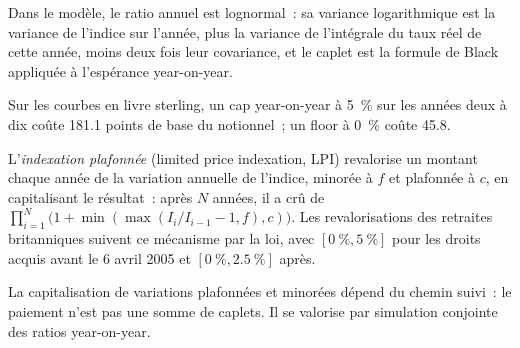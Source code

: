 Dans le modèle, le ratio annuel est lognormal~: sa variance logarithmique est la variance de l'indice
sur l'année, plus la variance de l'intégrale du taux réel de cette année, moins deux fois leur
covariance, et le caplet est la formule de Black appliquée à l'espérance year-on-year.

\begin{example}\label{ex:rc:inflation-derivatives:caps}
Sur les courbes en livre sterling, un cap year-on-year à 5~\% sur les années deux à dix coûte 181.1
points de base du notionnel~; un floor à 0~\% coûte 45.8.
\end{example}

\begin{definition}\label{def:rc:inflation-derivatives:lpi}
L'\emph{indexation plafonnée} (limited price indexation, LPI) revalorise un montant
chaque année de la variation annuelle de l'indice, minorée à $f$ et plafonnée à $c$, en capitalisant
le résultat~: après $N$ années, il a crû de $\prod_{i=1}^N\bigl(1+\min(\max(I_i/I_{i-1}-1,f),c)\bigr)$.
Les revalorisations des retraites britanniques suivent ce mécanisme par la loi, avec $[0~\%,5~\%]$ pour les droits acquis avant le 6
avril 2005 et $[0~\%,2.5~\%]$ après.
\end{definition}

La capitalisation de variations plafonnées et minorées dépend du chemin suivi~: le paiement n'est pas une somme de
caplets. Il se valorise par simulation conjointe des ratios year-on-year.

\label{lst:rc:inflation-derivatives:lpi}

\begin{omfigure}

\label{fig:rc:inflation-derivatives:lpi}
\end{omfigure}

